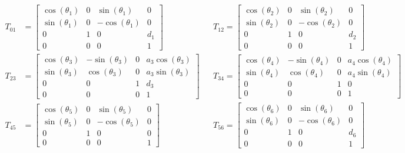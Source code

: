 \documentclass{article}
\begin{document}
\begin{align*}
T_{01} &=
\left[\begin{matrix}\cos{\left (\theta_{1} \right )} & 0 & \sin{\left (\theta_{1} \right )} & 0\\\sin{\left (\theta_{1} \right )} & 0 & - \cos{\left (\theta_{1} \right )} & 0\\0 & 1 & 0 & d_{1}\\0 & 0 & 0 & 1\end{matrix}\right]
&&T_{12} =
\left[\begin{matrix}\cos{\left (\theta_{2} \right )} & 0 & \sin{\left (\theta_{2} \right )} & 0\\\sin{\left (\theta_{2} \right )} & 0 & - \cos{\left (\theta_{2} \right )} & 0\\0 & 1 & 0 & d_{2}\\0 & 0 & 0 & 1\end{matrix}\right] \\
T_{23} &=
\left[\begin{matrix}\cos{\left (\theta_{3} \right )} & - \sin{\left (\theta_{3} \right )} & 0 & a_{3} \cos{\left (\theta_{3} \right )}\\\sin{\left (\theta_{3} \right )} & \cos{\left (\theta_{3} \right )} & 0 & a_{3} \sin{\left (\theta_{3} \right )}\\0 & 0 & 1 & d_{3}\\0 & 0 & 0 & 1\end{matrix}\right]
&&T_{34} =
\left[\begin{matrix}\cos{\left (\theta_{4} \right )} & - \sin{\left (\theta_{4} \right )} & 0 & a_{4} \cos{\left (\theta_{4} \right )}\\\sin{\left (\theta_{4} \right )} & \cos{\left (\theta_{4} \right )} & 0 & a_{4} \sin{\left (\theta_{4} \right )}\\0 & 0 & 1 & 0\\0 & 0 & 0 & 1\end{matrix}\right] \\
T_{45} &=
\left[\begin{matrix}\cos{\left (\theta_{5} \right )} & 0 & \sin{\left (\theta_{5} \right )} & 0\\\sin{\left (\theta_{5} \right )} & 0 & - \cos{\left (\theta_{5} \right )} & 0\\0 & 1 & 0 & 0\\0 & 0 & 0 & 1\end{matrix}\right]
&&T_{56} =
\left[\begin{matrix}\cos{\left (\theta_{6} \right )} & 0 & \sin{\left (\theta_{6} \right )} & 0\\\sin{\left (\theta_{6} \right )} & 0 & - \cos{\left (\theta_{6} \right )} & 0\\0 & 1 & 0 & d_{6}\\0 & 0 & 0 & 1\end{matrix}\right] \\

\end{align*}
\end{document}
